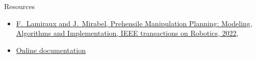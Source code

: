 \begin{frame} {Resources}
  \begin{itemize}
  \item \href{https://laas.hal.science/LAAS-GEPETTO/hal-02995125v2}{F.~Lamiraux and J.~Mirabel, Prehensile Manipulation Planning: Modeling, Algorithms and Implementation, IEEE transactions on Robotics, 2022},
  \item \href{https://humanoid-path-planner.github.io/hpp-doc}{Online documentation}
  \end{itemize}
\end{frame}
